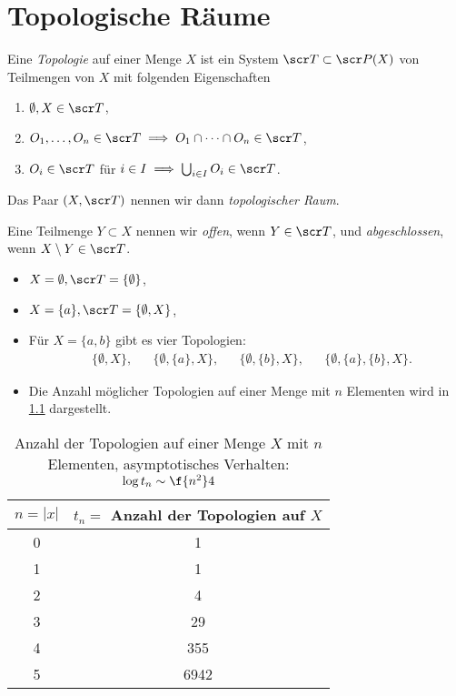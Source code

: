 
\chapter{Topologische Räume}


\begin{df}
	Eine \emph{Topologie} auf einer Menge $X$ ist ein System $\scr T \subset \scr P(X)$ von Teilmengen von $X$ mit folgenden Eigenschaften
	\begin{enumerate}[O1)]
		\item
			$\emptyset, X \in \scr T$,
		\item
			$O_1, \dotsc, O_n \in \scr T \implies O_1 \cap \dotsb \cap O_n \in \scr T$,
		\item
			$O_i \in \scr T$ für $i \in I \implies \bigcup_{i\in I} O_i \in \scr T$.
	\end{enumerate}
	Das Paar $(X, \scr T)$ nennen wir dann \emph{topologischer Raum}.

	Eine Teilmenge $Y \subset X$ nennen wir \emph{offen}, wenn $Y \in \scr T$, und \emph{abgeschlossen}, wenn $X \setminus Y \in \scr T$.
\end{df}

\begin{ex}
	\begin{itemize}
		\item
			$X = \emptyset, \scr T = \{\emptyset\}$,
		\item
			$X = \{a\}, \scr T = \{ \emptyset, X \}$,
		\item
			Für $X = \{a,b\}$ gibt es vier Topologien:
			\begin{align*}
				&\{\emptyset, X\}, &
				&\{\emptyset, \{a\}, X\}, &
				&\{\emptyset, \{b\}, X \}, &
				&\{\emptyset, \{a\}, \{b\}, X\}.
			\end{align*}
		\item
			Die Anzahl möglicher Topologien auf einer Menge mit $n$ Elementen wird in \ref{tab:topcount} dargestellt.
	\end{itemize}
	\begin{table}[h]
		\centering
		\begin{tabular}{c|c}
			$n=|x|$ & $t_n = $ Anzahl der Topologien auf $X$ \\ \hline
			0 & 1 \\
			1 & 1 \\
			2 & 4 \\
			3 & 29 \\
			4 & 355 \\
			5 & 6942
		\end{tabular}
		\caption{Anzahl der Topologien auf einer Menge $X$ mit $n$ Elementen, asymptotisches Verhalten: $\log t_n \sim \f {n^2}4$}
		\label{tab:topcount}
	\end{table}
\end{ex}

